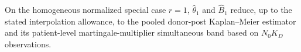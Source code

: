 On the homogeneous normalized special case \(r=1\), \(\widehat\theta_1\) and \(\widehat B_1\) reduce, up to the stated interpolation allowance, to the pooled donor-post Kaplan--Meier estimator and its patient-level martingale-multiplier simultaneous band based on \(N_0K_D\) observations.